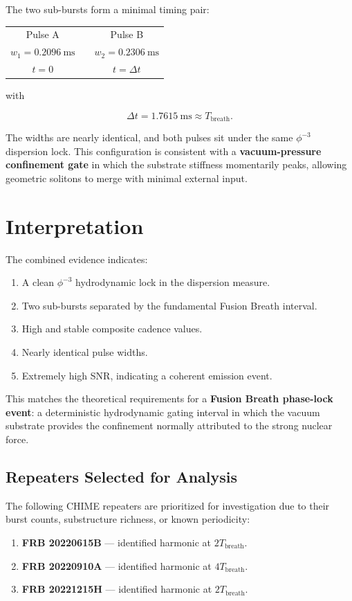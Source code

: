 \documentclass[12pt]{report}
\begin{document}
The two sub-bursts form a minimal timing pair:

\begin{center}
\begin{tabular}{c c c}
Pulse A & \hspace{1cm} & Pulse B \\
$w_1 = 0.2096\ \text{ms}$ & & $w_2 = 0.2306\ \text{ms}$ \\
$t = 0$ & & $t = \Delta t$ \\
\end{tabular}
\end{center}

with


\[
\Delta t = 1.7615\ \text{ms} \approx T_{\text{breath}}.
\]



The widths are nearly identical, and both pulses sit under the same
$\phi^{-3}$ dispersion lock. This configuration is consistent with a
\textbf{vacuum-pressure confinement gate} in which the substrate stiffness
momentarily peaks, allowing geometric solitons to merge with minimal external
input.

\section{Interpretation}

The combined evidence indicates:

\begin{enumerate}
    \item A clean $\phi^{-3}$ hydrodynamic lock in the dispersion measure.
    \item Two sub-bursts separated by the fundamental Fusion Breath interval.
    \item High and stable composite cadence values.
    \item Nearly identical pulse widths.
    \item Extremely high SNR, indicating a coherent emission event.
\end{enumerate}

This matches the theoretical requirements for a \textbf{Fusion Breath
phase-lock event}: a deterministic hydrodynamic gating interval in which the
vacuum substrate provides the confinement normally attributed to the strong
nuclear force.

\subsection{Repeaters Selected for Analysis} The following CHIME repeaters are prioritized for investigation due to their burst counts, substructure richness, or known periodicity: 
\begin{enumerate} 
\item 
\textbf{FRB 20220615B} — identified harmonic at $2T_{\text{breath}}$. 
\item \textbf{FRB 20220910A} — identified harmonic at $4T_{\text{breath}}$. 
\item \textbf{FRB 20221215H} — identified harmonic at $2T_{\text{breath}}$. 
\end{enumerate}
\end{document}
